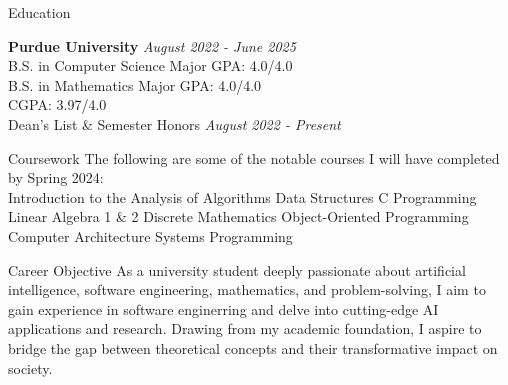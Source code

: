 \documentclass[
	11pt, %
]{resume} %
\begin{document}

\begin{rSection}{Education}
	
	\textbf{Purdue University} \hfill \textit{August 2022 - June 2025} \\ 
	B.S. in Computer Science \hfill Major GPA: 4.0/4.0 \\
	B.S. in Mathematics \hfill Major GPA: 4.0/4.0 \\
	\hspace*{\fill}  CGPA: 3.97/4.0 \\
	Dean's List \& Semester Honors \hfill {\em August 2022 - Present}
	
\end{rSection}


\begin{rSection}{Coursework}
The following are some of the notable courses I will have completed by Spring 2024: \\
Introduction to the Analysis of Algorithms
Data Structures
C Programming
Linear Algebra 1 \& 2 
Discrete Mathematics
Object-Oriented Programming
Computer Architecture
Systems Programming

\end{rSection}


\begin{rSection}{Career Objective}
  \small{As a university student deeply passionate about artificial intelligence, software engineering, mathematics, and problem-solving, I aim to gain experience in software enginerring and delve into cutting-edge AI applications and research. Drawing from my academic foundation, I aspire to bridge the gap between theoretical concepts and their transformative impact on society.}
\end{rSection}

\end{document}
